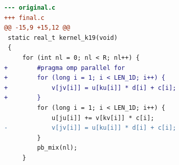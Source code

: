 \begin{lstlisting}[language=diff,basicstyle=\ttfamily\scriptsize,breaklines=true,caption={tsvc_b1/k19 — FASTER (e2v3_k19)}]
--- original.c
+++ final.c
@@ -15,9 +15,12 @@
 static real_t kernel_k19(void)
 {
     for (int nl = 0; nl < R; nl++) {
+        #pragma omp parallel for 
+        for (long i = 1; i < LEN_1D; i++) {
+            v[jv[i]] = u[ku[i]] * d[i] + c[i];
+        }
         for (long i = 1; i < LEN_1D; i++) {
             u[ju[i]] += v[kv[i]] * c[i];
-            v[jv[i]] = u[ku[i]] * d[i] + c[i];
         }
         pb_mix(nl);
     }
\end{lstlisting}
